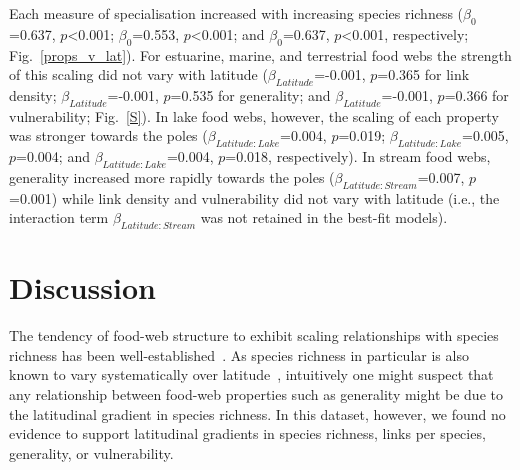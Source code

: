 \documentclass[12pt]{article}
\begin{document}
  Each measure of specialisation increased with increasing
  species richness ($\beta_0$=0.637, $p$\textless0.001; $\beta_0$=0.553,
  $p$\textless0.001; and $\beta_0$=0.637, $p$\textless0.001, respectively;
  Fig.~\ref{props_v_lat}). For estuarine, marine, and terrestrial food webs the
  strength of this scaling did not vary with latitude
  ($\beta_{Latitude}$=-0.001, $p$=0.365 for link density;
  $\beta_{Latitude}$=-0.001, $p$=0.535 for generality; and
  $\beta_{Latitude}$=-0.001, $p$=0.366 for vulnerability; Fig.~\ref{S}). In
  lake food webs, however, the scaling of each property was stronger towards
  the poles ($\beta_{Latitude:Lake}$=0.004, $p$=0.019;
  $\beta_{Latitude:Lake}$=0.005, $p$=0.004; and
  $\beta_{Latitude:Lake}$=0.004, $p$=0.018, respectively). In stream food
  webs, generality increased more rapidly towards the poles
  ($\beta_{Latitude:Stream}$=0.007, $p$=0.001) while link density and
  vulnerability did not vary with latitude (i.e., the interaction term 
  $\beta_{Latitude:Stream}$ was not retained in the best-fit models).


\section*{Discussion}

  The tendency of food-web structure to exhibit scaling relationships with
  species richness has been well-established~\cite{Dunne2004,Riede2010}. As
  species richness in particular is also known to vary systematically over
  latitude~\cite{Kaufman1995,Macpherson2002,Hillebrand2004,Schemske2009},
  intuitively one might suspect that any relationship between food-web
  properties such as generality might be due to the latitudinal gradient in
  species richness. In this dataset, however, we found no evidence to support
  latitudinal gradients in species richness, links per species, generality, or
  vulnerability.
\end{document}
